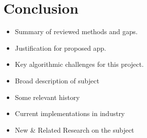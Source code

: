 
\section{Conclusion}

\begin{itemize}
    \item Summary of reviewed methods and gaps.
    \item Justification for proposed app.
    \item Key algorithmic challenges for this project.
\end{itemize}

\begin{itemize}
	\item{Broad description of subject}
	\item{Some relevant history}
	\item{Current implementations in industry}
	\item{New \& Related Research on the subject}
\end{itemize}